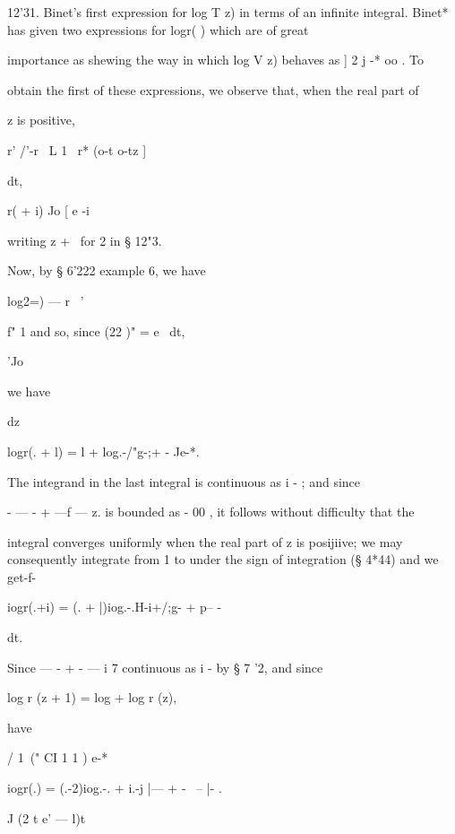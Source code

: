 12'31. Binet's first expression for log T  z) in terms of an infinite integral. 
Binet* has given two expressions for logr( ) which are of great 



importance as shewing the way in which log V  z) behaves as ] 2 j -* oo . To 

obtain the first of these expressions, we observe that, when the real part of 

z is positive, 

r' /'-r \ L 1 \ r* (o-t o-tz ] 

dt, 



r(  + i) Jo [  e -i 



writing z + \ for 2  in § 12"3. 

Now, by § 6'222 example 6, we have 



log2=)   — r~ ' 



f" 1 
and so, since (22 )"  =   e~  dt, 

'Jo   



we have 

dz 



logr(. + l) = l + log.-/"g-;+ - Je-*. 



The integrand in the last integral is continuous as i -  ; and since 

- — - + —f — z. is bounded as   -  00 , it follows without difficulty that the 

integral converges uniformly when the real part of z is posijiive; we may 
consequently integrate from 1 to   under the sign of integration (§ 4*44) and 
we get-f- 

iogr(.+i) = (. + |)iog.-.H-i+/;g-  +  p-- - 



dt. 



Since    — - + -  —  i 7   continuous as i  - by § 7 '2, and since 

log r (z + 1) = log  + log r (z), 

have 

/ 1\ ("  CI 1 1 ) e-*  

iogr(.) = (.-2)iog.-. + i.-j |--- +  - \ -- |- . 



J (2 t e'  — l)t 

